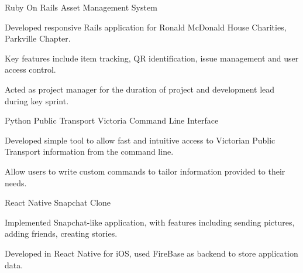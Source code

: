 \begin{cventries}
  \cventry
    {Ruby On Rails}
    {Asset Management System}
    {}
    {}
    {
      \begin{cvitems}
        \item {Developed responsive Rails application for Ronald McDonald House Charities, Parkville Chapter.}
        \item {Key features include item tracking, QR identification, issue management and user access control.}
        \item {Acted as project manager for the duration of project and development lead during key sprint.}
      \end{cvitems}
    }
  \cventry
    {Python}
    {Public Transport Victoria Command Line Interface}
    {}
    {}
    {
      \begin{cvitems}
      	\item {Developed simple tool to allow fast and intuitive access to Victorian Public Transport information from the command line.}
        \item {Allow users to write custom commands to tailor information provided to their needs.}
      \end{cvitems}
    }
   \cventry
    {React Native}
    {Snapchat Clone}
    {}
    {}
    {
      \begin{cvitems}
      	\item {Implemented Snapchat-like application, with features including sending pictures, adding friends, creating stories.}
      	\item {Developed in React Native for iOS, used FireBase as backend to store application data.}
      \end{cvitems}
    }
\end{cventries}
\vspace{-5mm}
